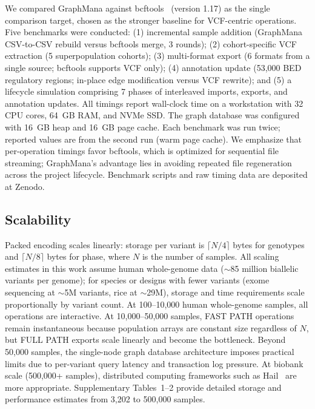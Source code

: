 \documentclass[pdflatex,sn-nature]{sn-jnl}
\begin{document}
We compared GraphMana against bcftools~\cite{danecek2021bcftools} (version 1.17) as the single comparison target, chosen as the stronger baseline for VCF-centric operations. Five benchmarks were conducted: (1) incremental sample addition (GraphMana CSV-to-CSV rebuild versus bcftools merge, 3 rounds); (2) cohort-specific VCF extraction (5 superpopulation cohorts); (3) multi-format export (6 formats from a single source; bcftools supports VCF only); (4) annotation update (53,000 BED regulatory regions; in-place edge modification versus VCF rewrite); and (5) a lifecycle simulation comprising 7 phases of interleaved imports, exports, and annotation updates. All timings report wall-clock time on a workstation with 32 CPU cores, 64~GB RAM, and NVMe SSD. The graph database was configured with 16~GB heap and 16~GB page cache. Each benchmark was run twice; reported values are from the second run (warm page cache). We emphasize that per-operation timings favor bcftools, which is optimized for sequential file streaming; GraphMana's advantage lies in avoiding repeated file regeneration across the project lifecycle. Benchmark scripts and raw timing data are deposited at Zenodo.

\subsection*{Scalability}

Packed encoding scales linearly: storage per variant is $\lceil N/4 \rceil$ bytes for genotypes and $\lceil N/8 \rceil$ bytes for phase, where $N$ is the number of samples. All scaling estimates in this work assume human whole-genome data (${\sim}$85 million biallelic variants per genome); for species or designs with fewer variants (exome sequencing at ${\sim}$5M variants, rice at ${\sim}$29M), storage and time requirements scale proportionally by variant count. At 100--10,000 human whole-genome samples, all operations are interactive. At 10,000--50,000 samples, FAST PATH operations remain instantaneous because population arrays are constant size regardless of $N$, but FULL PATH exports scale linearly and become the bottleneck. Beyond 50,000 samples, the single-node graph database architecture imposes practical limits due to per-variant query latency and transaction log pressure. At biobank scale (500,000+ samples), distributed computing frameworks such as Hail~\cite{hail} are more appropriate. Supplementary Tables~1--2 provide detailed storage and performance estimates from 3,202 to 500,000 samples.
\end{document}
